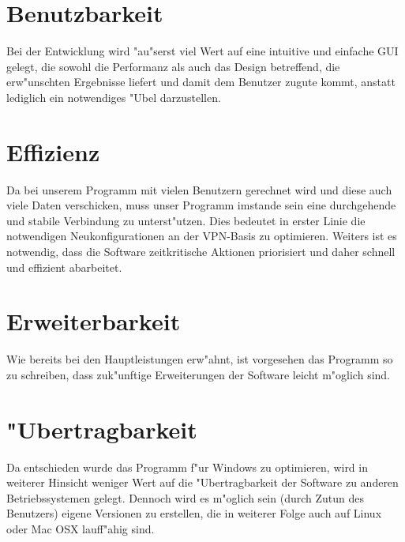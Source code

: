 \documentclass[a4paper,12pt]{scrreprt}
\begin{document}
	\section{Benutzbarkeit}
	Bei der Entwicklung wird "au"serst viel Wert auf eine intuitive und einfache GUI gelegt, die sowohl die Performanz als auch das Design betreffend, die erw"unschten Ergebnisse liefert und damit dem Benutzer zugute kommt, anstatt lediglich ein notwendiges "Ubel darzustellen. 
			
	\section{Effizienz}
	Da bei unserem Programm  mit vielen Benutzern gerechnet wird und diese auch viele Daten verschicken, muss unser Programm imstande sein eine durchgehende und stabile Verbindung zu unterst"utzen. Dies bedeutet in erster Linie die notwendigen Neukonfigurationen an der VPN-Basis zu optimieren. Weiters ist es notwendig, dass die Software zeitkritische Aktionen priorisiert und daher schnell und effizient abarbeitet.
		
		
	\section{Erweiterbarkeit}
	Wie bereits bei den Hauptleistungen erw"ahnt, ist vorgesehen das Programm so zu schreiben, dass zuk"unftige Erweiterungen der Software leicht m"oglich sind. 
		
	\section{"Ubertragbarkeit}
	Da entschieden wurde das Programm f"ur Windows zu optimieren, wird in weiterer Hinsicht weniger Wert auf die "Ubertragbarkeit der Software zu anderen Betriebssystemen gelegt. Dennoch wird es m"oglich sein (durch Zutun des Benutzers) eigene Versionen zu erstellen, die in weiterer Folge auch auf Linux oder Mac OSX lauff"ahig sind.
%
\end{document}
